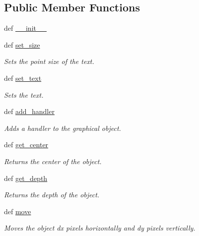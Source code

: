 \subsection*{Public Member Functions}
\begin{DoxyCompactItemize}
\item 
def \hyperlink{classcs110graphics_1_1Text_a022ce78a2945edbd8dfe3c4498769a62}{\_\-\_\-init\_\-\_\-}
\item 
def \hyperlink{classcs110graphics_1_1Text_ad470aa26235fc2f5f1459c3750251207}{set\_\-size}
\begin{DoxyCompactList}\small\item\em Sets the point size of the text. \item\end{DoxyCompactList}\item 
def \hyperlink{classcs110graphics_1_1Text_ab12aa7478ca6a2b2015b7e8544674c73}{set\_\-text}
\begin{DoxyCompactList}\small\item\em Sets the text. \item\end{DoxyCompactList}\item 
def \hyperlink{classcs110graphics_1_1GraphicalObject_adb1af0d5a6baae3f9a08d21a3227c49f}{add\_\-handler}
\begin{DoxyCompactList}\small\item\em Adds a handler to the graphical object. \item\end{DoxyCompactList}\item 
def \hyperlink{classcs110graphics_1_1GraphicalObject_a062789c4cc9de38af32dcc4ff2058607}{get\_\-center}
\begin{DoxyCompactList}\small\item\em Returns the center of the object. \item\end{DoxyCompactList}\item 
def \hyperlink{classcs110graphics_1_1GraphicalObject_a6d9f5718cd0cf249e0d2842971bae17f}{get\_\-depth}
\begin{DoxyCompactList}\small\item\em Returns the depth of the object. \item\end{DoxyCompactList}\item 
def \hyperlink{classcs110graphics_1_1GraphicalObject_aa64d270fb83efa4a54e1a7953512f9cd}{move}
\begin{DoxyCompactList}\small\item\em Moves the object dx pixels horizontally and dy pixels vertically. \item\end{DoxyCompactList}\item 

\end{DoxyCompactItemize}
